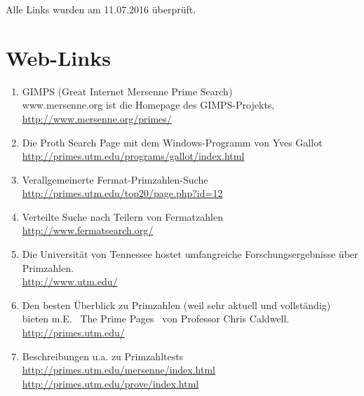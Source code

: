\begin{refsegment}
\printbibliography[%
	heading=subbibintoc,
	title={Literatur zu Kapitel \thechapter},
	segment=\therefsegment,
]

 Alle Links wurden am 11.07.2016 überprüft.


\chapter*{Web-Links}

\begin{enumerate}
   \item GIMPS (Great Internet Mersenne Prime Search)
       \\
         www.mersenne.org ist die Homepage des GIMPS-Projekts,  \\
      \url{http://www.mersenne.org/primes/}

\item Die Proth Search Page mit dem Windows-Programm von Yves Gallot \\
      \url{http://primes.utm.edu/programs/gallot/index.html}

\item Verallgemeinerte Fermat-Primzahlen-Suche \\
      \url{http://primes.utm.edu/top20/page.php?id=12}

\item Verteilte Suche nach Teilern von Fermatzahlen \\
      \url{http://www.fermatsearch.org/}

\item Die Universität von Tennessee hostet umfangreiche
      Forschungsergebnisse über Primzahlen. \\
      \url{http://www.utm.edu/}

\item Den besten Überblick zu Primzahlen (weil sehr aktuell und vollständig)
      bieten m.E.  ~\glqq The Prime Pages\grqq~ von Professor Chris Caldwell.
       \\
      \url{http://primes.utm.edu/}

\item Beschreibungen u.a. zu Primzahltests\\
      \url{http://primes.utm.edu/mersenne/index.html}\\
      \url{http://primes.utm.edu/prove/index.html}


\end{enumerate}
\end{refsegment}
